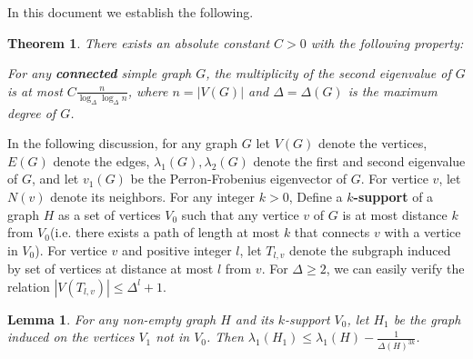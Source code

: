 \documentclass{article}
\theoremstyle{definition} %
\theoremstyle{plain} %
\newtheorem{theorem}{Theorem}
\newtheorem{lemma}{Lemma}
\begin{document}
In this document we establish the following.

\begin{theorem}
There exists an absolute constant $C>0$ with the following property:

For any \textbf{connected} simple graph $G$, the multiplicity of the second eigenvalue of $G$ is at most $C\frac{n}{\log_\Delta\log_\Delta n}$, where $n = |V(G)|$ and $\Delta = \Delta(G)$ is the maximum degree of $G$.
\end{theorem}
In the following discussion, for any graph $G$ let $V(G)$ denote the vertices, $E(G)$ denote the edges, $\lambda_1(G),\lambda_2(G)$ denote the first and second eigenvalue of $G$, and let $v_1(G)$ be the Perron-Frobenius eigenvector of $G$. For vertice $v$, let $N(v)$ denote its neighbors. For any integer $k > 0$, Define a \textbf{$k$-support} of a graph $H$ as a set of vertices $V_0$ such that any vertice $v$ of $G$ is at most distance $k$ from $V_0$(i.e. there exists a path of length at most $k$ that connects $v$ with a vertice in $V_0$). For vertice $v$ and positive integer $l$, let $T_{l,v}$ denote the subgraph induced by set of vertices at distance at most $l$ from $v$. For $\Delta \geq 2$, we can easily verify the relation $|V(T_{l,v})| \leq \Delta^l + 1$.
\begin{lemma}
For any non-empty graph $H$ and its $k$-support $V_0$, let $H_1$ be the graph induced on the vertices $V_1$ not in $V_0$. Then $\lambda_1(H_1)\leq \lambda_1(H) -  \frac{1}{\Delta(H)^{3k}}$.
\end{lemma}
\end{document}
